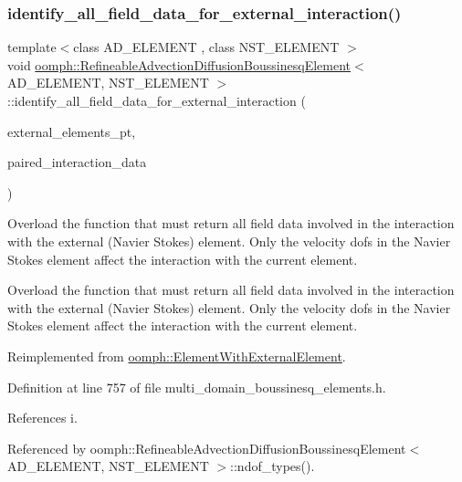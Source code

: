\subsubsection{\texorpdfstring{identify\+\_\+all\+\_\+field\+\_\+data\+\_\+for\+\_\+external\+\_\+interaction()}{identify\_all\_field\_data\_for\_external\_interaction()}}
{\footnotesize\ttfamily template$<$class A\+D\+\_\+\+E\+L\+E\+M\+E\+NT , class N\+S\+T\+\_\+\+E\+L\+E\+M\+E\+NT $>$ \\
void \hyperlink{classoomph_1_1RefineableAdvectionDiffusionBoussinesqElement}{oomph\+::\+Refineable\+Advection\+Diffusion\+Boussinesq\+Element}$<$ A\+D\+\_\+\+E\+L\+E\+M\+E\+NT, N\+S\+T\+\_\+\+E\+L\+E\+M\+E\+NT $>$\+::identify\+\_\+all\+\_\+field\+\_\+data\+\_\+for\+\_\+external\+\_\+interaction (\begin{DoxyParamCaption}\item[{\hyperlink{classoomph_1_1Vector}{Vector}$<$ std\+::set$<$ \hyperlink{classoomph_1_1FiniteElement}{Finite\+Element} $\ast$$>$ $>$ const \&}]{external\+\_\+elements\+\_\+pt,  }\item[{std\+::set$<$ std\+::pair$<$ \hyperlink{classoomph_1_1Data}{Data} $\ast$, unsigned $>$ $>$ \&}]{paired\+\_\+interaction\+\_\+data }\end{DoxyParamCaption})\hspace{0.3cm}{\ttfamily [virtual]}}



Overload the function that must return all field data involved in the interaction with the external (Navier Stokes) element. Only the velocity dofs in the Navier Stokes element affect the interaction with the current element. 

Overload the function that must return all field data involved in the interaction with the external (Navier Stokes) element. Only the velocity dofs in the Navier Stokes element affect the interaction with the current element. 

Reimplemented from \hyperlink{classoomph_1_1ElementWithExternalElement_a822d64019a82588e16053ec86f37226c}{oomph\+::\+Element\+With\+External\+Element}.



Definition at line 757 of file multi\+\_\+domain\+\_\+boussinesq\+\_\+elements.\+h.



References i.



Referenced by oomph\+::\+Refineable\+Advection\+Diffusion\+Boussinesq\+Element$<$ A\+D\+\_\+\+E\+L\+E\+M\+E\+N\+T, N\+S\+T\+\_\+\+E\+L\+E\+M\+E\+N\+T $>$\+::ndof\+\_\+types().

